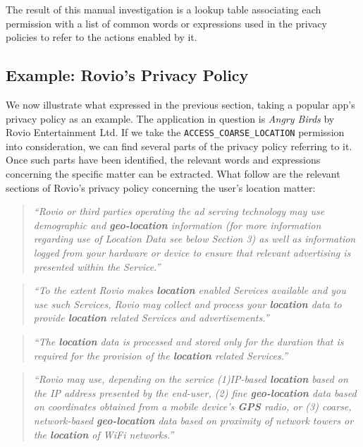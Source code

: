 The result of this manual investigation is a lookup table associating each permission with a list of common words or expressions used in the privacy policies to refer to the actions enabled by it.

\subsection{Example: Rovio's Privacy Policy}
We now illustrate what expressed in the previous section, taking a popular app's privacy policy as an example. The application in question is \emph{Angry Birds} by Rovio Entertainment Ltd. If we take the \texttt{ACCESS\_COARSE\_LOCATION} permission into consideration, we can find several parts of the privacy policy referring to it. Once such parts have been identified, the relevant words and expressions concerning the specific matter can be extracted. What follow are the relevant sections of Rovio's privacy policy concerning the user's location matter\cite{rovio}:

\begin{quote}
\emph{``Rovio or third parties operating the ad serving technology may use demographic and \textbf{geo-location} information (for more information regarding use of Location Data see below Section 3) as well as information logged from your hardware or device to ensure that relevant advertising is presented within the Service.''}
\end{quote}

\begin{quote}
\emph{``To the extent Rovio makes \textbf{location} enabled Services available and you use such Services, Rovio may collect and process your \textbf{\textbf{location}} data to provide \textbf{location} related Services and advertisements.''}
\end{quote}

\begin{quote}
\emph{``The \textbf{location} data is processed and stored only for the duration that is required for the provision of the \textbf{location} related Services.''}
\end{quote}

\begin{quote}
\emph{``Rovio may use, depending on the service (1)IP-based \textbf{location} based on the IP address presented by the end-user, (2) fine \textbf{geo-location} data based on coordinates obtained from a mobile device's \textbf{GPS} radio, or (3) coarse, network-based \textbf{geo-location} data based on proximity of network towers or the \textbf{location} of WiFi networks.''}
\end{quote}

